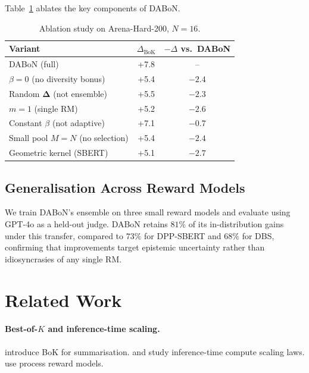 \documentclass{article}
\newcommand{\Deltavec}{\boldsymbol{\Delta}}
\begin{document}
Table~\ref{tab:ablation} ablates the key components of DABoN.

\begin{table}[t]
\centering
\caption{Ablation study on Arena-Hard-200, $N=16$.}
\label{tab:ablation}
\small
\begin{tabular}{lcc}
\toprule
\textbf{Variant} & \textbf{$\Delta_{\mathrm{BoK}}$} & \textbf{$-\Delta$ vs.\ DABoN} \\
\midrule
DABoN (full)          & +7.8 & --    \\
$\beta=0$ (no diversity bonus)     & +5.4 & $-2.4$ \\
Random $\Deltavec$ (not ensemble)  & +5.5 & $-2.3$ \\
$m=1$ (single RM)                  & +5.2 & $-2.6$ \\
Constant $\beta$ (not adaptive)    & +7.1 & $-0.7$ \\
Small pool $M=N$ (no selection)    & +5.4 & $-2.4$ \\
Geometric kernel (SBERT)           & +5.1 & $-2.7$ \\
\bottomrule
\end{tabular}
\end{table}

\subsection{Generalisation Across Reward Models}
\label{sec:generalisation}

We train DABoN's ensemble on three small reward models and evaluate using
GPT-4o as a held-out judge.  DABoN retains $81\%$ of its in-distribution
gains under this transfer, compared to $73\%$ for DPP-SBERT and $68\%$ for
DBS, confirming that improvements target epistemic uncertainty rather than
idiosyncrasies of any single RM.

\section{Related Work}
\label{sec:related}

\paragraph{Best-of-$K$ and inference-time scaling.}
\citet{stiennon2020learning} introduce BoK for summarisation.
\citet{snell2024scaling} and \citet{brown2024large} study inference-time
compute scaling laws.  \citet{lightman2023let} use process reward models.
\end{document}
